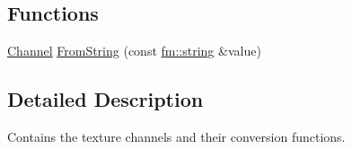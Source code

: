 \subsection*{Functions}
\begin{DoxyCompactItemize}
\item 
\hyperlink{namespaceFUDaeTextureChannel_a816e9776262dffc532a4a8d94deadb35}{Channel} \hyperlink{namespaceFUDaeTextureChannel_ab9e886c5e554154e79b7e6a038063731}{FromString} (const \hyperlink{classfm_1_1stringT}{fm::string} \&value)
\end{DoxyCompactItemize}


\subsection{Detailed Description}
Contains the texture channels and their conversion functions. 

